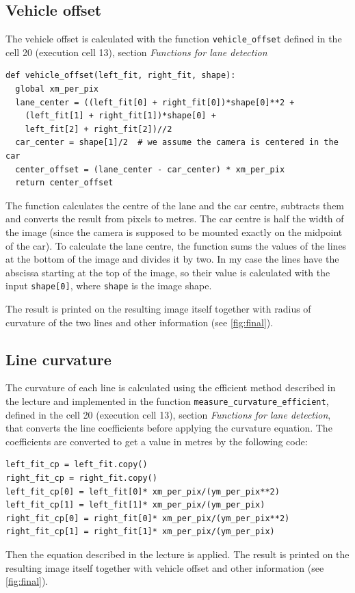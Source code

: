 \documentclass{article}
\let\cd\lstinline
\begin{document}
\subsection{Vehicle offset}
The vehicle offset is calculated with the function \cd+vehicle_offset+ defined in the cell 20 (execution cell 13), section \textit{Functions for lane detection}
\begin{lstlisting}
def vehicle_offset(left_fit, right_fit, shape):
  global xm_per_pix
  lane_center = ((left_fit[0] + right_fit[0])*shape[0]**2 + 
    (left_fit[1] + right_fit[1])*shape[0] +
    left_fit[2] + right_fit[2])//2
  car_center = shape[1]/2  # we assume the camera is centered in the car
  center_offset = (lane_center - car_center) * xm_per_pix
  return center_offset
\end{lstlisting}
The function calculates the centre of the lane and the car centre, subtracts them and converts the result from pixels to metres. The car centre is half the width of the image (since the camera is supposed to be mounted exactly on the midpoint of the car). To calculate the lane centre, the function sums the values of the lines at the bottom of the image and divides it by two. In my case the lines have the abscissa starting at the top of the image, so their value is calculated with the input \cd+shape[0]+, where \cd+shape+ is the image shape.

The result is printed on the resulting image itself together with radius of curvature of the two lines and other information (see \autoref{fig:final}).

\subsection{Line curvature}
The curvature of each line is calculated using the efficient method described in the lecture and implemented in the function \cd+measure_curvature_efficient+, defined in the cell 20 (execution cell 13), section \textit{Functions for lane detection}, that converts the line coefficients before applying the curvature equation. The coefficients are converted to get a value in metres by the following code:

\begin{lstlisting}
left_fit_cp = left_fit.copy()
right_fit_cp = right_fit.copy()
left_fit_cp[0] = left_fit[0]* xm_per_pix/(ym_per_pix**2)
left_fit_cp[1] = left_fit[1]* xm_per_pix/(ym_per_pix)
right_fit_cp[0] = right_fit[0]* xm_per_pix/(ym_per_pix**2)
right_fit_cp[1] = right_fit[1]* xm_per_pix/(ym_per_pix)
\end{lstlisting}
Then the equation described in the lecture is applied.
The result is printed on the resulting image itself together with vehicle offset and other information (see \autoref{fig:final}).
\end{document}
